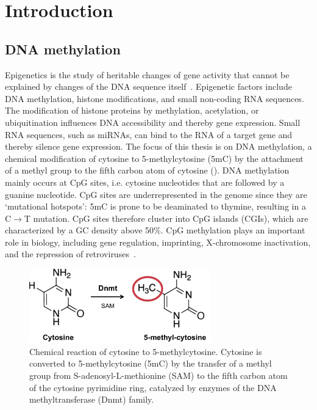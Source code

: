 
\chapter{Introduction} \label{sec:intro}

\ifpdf
    \graphicspath{{Chapter1/Figs/Raster/}{Chapter1/Figs/PDF/}{Chapter1/Figs/}}
\else
    \graphicspath{{Chapter1/Figs/Vector/}{Chapter1/Figs/}}
\fi

\section{DNA methylation} \label{sec:intro_met}

Epigenetics is the study of heritable changes of gene activity that cannot be explained by changes of the DNA sequence itself~\citep{holliday_dna_1996}. Epigenetic factors include DNA methylation, histone modifications, and small non-coding RNA sequences. The modification of histone proteins by methylation, acetylation, or ubiquitination influences DNA accessibility and thereby gene expression. Small RNA sequences, such as miRNAs, can bind to the RNA of a target gene and thereby silence gene expression. The focus of this thesis is on DNA methylation, a chemical modification of cytosine to 5-methylcytosine (5mC) by the attachment of a methyl group to the fifth carbon atom of cytosine ().  DNA methylation mainly occurs at CpG sites, i.e. cytosine nucleotides that are followed by a guanine nucleotide. CpG sites are underrepresented in the genome since they are `mutational hotspots': 5mC is prone to be deaminated to thymine, resulting in a C$\rightarrow$T mutation. CpG sites therefore cluster into CpG islands (CGIs), which are characterized by a GC density above 50\%. CpG methylation plays an important role in biology, including gene regulation, imprinting, X-chromosome inactivation, and the repression of retroviruses~\citep{holliday_dna_1996,robertson_dna_2005,jones_functions_2012,moore_dna_2013}.

\begin{figure}[htbp!]
\centering
\includegraphics[width=0.7\textwidth]{cpg}
\caption[Chemical reaction of cytosine to 5-methylcytosine.]{Chemical reaction of cytosine to 5-methylcytosine. Cytosine is converted to 5-methylcytosine (5mC) by the transfer of a methyl group from S-adenosyl-L-methionine (SAM) to the fifth carbon atom of the cytosine pyrimidine ring, catalyzed by enzymes of the DNA methyltransferase (Dnmt) family.}
\label{fig:intro_cpg}
\end{figure}

